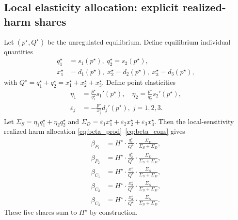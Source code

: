 \documentclass[journal, a4paper]{IEEEtran}
\begin{document}
\subsection{Local elasticity allocation: explicit realized-harm shares}
Let $(p^\star,Q^\star)$ be the unregulated equilibrium. Define equilibrium individual quantities
\begin{align}
q_1^\star&=s_1(p^\star),\; q_2^\star=s_2(p^\star),\\
x_1^\star&=d_1(p^\star),\; x_2^\star=d_2(p^\star),\; x_3^\star=d_3(p^\star),
\end{align}
with $Q^\star=q_1^\star+q_2^\star=x_1^\star+x_2^\star+x_3^\star$.
Define point elasticities
\begin{align}
\eta_1&=\frac{p^\star}{q_1^\star}s_1'(p^\star),\quad
\eta_2=\frac{p^\star}{q_2^\star}s_2'(p^\star),\\
\varepsilon_j&=-\frac{p^\star}{x_j^\star}d_j'(p^\star),\; j=1,2,3.
\end{align}
Let $\Sigma_S=\eta_1 q_1^\star+\eta_2 q_2^\star$ and $\Sigma_D=\varepsilon_1 x_1^\star+\varepsilon_2 x_2^\star+\varepsilon_3 x_3^\star$.
Then the local-sensitivity realized-harm allocation \eqref{eq:beta_prod}--\eqref{eq:beta_cons} gives
\begin{align}
\beta_{P_1} &= H^\star\cdot \frac{q_1^\star}{Q^\star}\cdot \frac{\Sigma_D}{\Sigma_S+\Sigma_D},\\
\beta_{P_2} &= H^\star\cdot \frac{q_2^\star}{Q^\star}\cdot \frac{\Sigma_D}{\Sigma_S+\Sigma_D},\\[2ex]
\beta_{C_1} &= H^\star\cdot \frac{x_1^\star}{Q^\star}\cdot \frac{\Sigma_S}{\Sigma_S+\Sigma_D},\\
\beta_{C_2} &= H^\star\cdot \frac{x_2^\star}{Q^\star}\cdot \frac{\Sigma_S}{\Sigma_S+\Sigma_D},\\
\beta_{C_3} &= H^\star\cdot \frac{x_3^\star}{Q^\star}\cdot \frac{\Sigma_S}{\Sigma_S+\Sigma_D}.
\end{align}
These five shares sum to $H^\star$ by construction.
\end{document}
